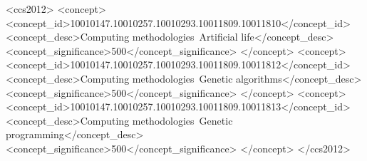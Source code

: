 \documentclass[sigconf]{acmart}
\begin{document}
%
%
\begin{CCSXML}
<ccs2012>
<concept>
<concept_id>10010147.10010257.10010293.10011809.10011810</concept_id>
<concept_desc>Computing methodologies~Artificial life</concept_desc>
<concept_significance>500</concept_significance>
</concept>
<concept>
<concept_id>10010147.10010257.10010293.10011809.10011812</concept_id>
<concept_desc>Computing methodologies~Genetic algorithms</concept_desc>
<concept_significance>500</concept_significance>
</concept>
<concept>
<concept_id>10010147.10010257.10010293.10011809.10011813</concept_id>
<concept_desc>Computing methodologies~Genetic programming</concept_desc>
<concept_significance>500</concept_significance>
</concept>
</ccs2012>
\end{CCSXML}





\maketitle




 
\end{document}
